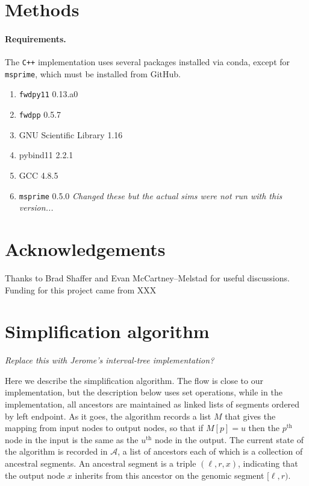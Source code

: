 \documentclass{article}
\newcommand{\fwdpp}{\texttt{fwdpp}}
\newcommand{\fwdpy}{\texttt{fwdpy11}}
\newcommand{\cpp}{\texttt{C++}}
\newcommand{\msprime}{\texttt{msprime}}
\newcommand{\Al}{\mathcal{A}}  %
\newcommand{\plr}[1]{{\em \color{blue} #1}}
\newcommand{\jda}[1]{{\em \color{cyan} #1}}
\begin{document}
\section*{Methods}

\paragraph{Requirements.}
The \cpp{} implementation uses several packages installed via conda,
except for \msprime{}, which must be installed from GitHub.

\begin{enumerate}
    \item \fwdpy{} 0.13.a0
    \item \fwdpp{} 0.5.7
    \item GNU Scientific Library 1.16
    \item pybind11 2.2.1
    \item GCC 4.8.5
    \item \msprime{} 0.5.0 \jda{Changed these but the actual sims were not run
		    with this version...}
\end{enumerate}

\section*{Acknowledgements}
Thanks to Brad Shaffer and Evan McCartney--Melstad for useful discussions.
Funding for this project came from XXX




\appendix

\section{Simplification algorithm}
\label{ss:simplify_algorithm}

\plr{Replace this with Jerome's interval-tree implementation?}

Here we describe the simplification algorithm.
The flow is close to our implementation,
but the description below uses set operations,
while in the implementation,
all ancestors are maintained as linked lists of segments
ordered by left endpoint.
As it goes, the algorithm
records a list $M$ that gives the mapping
from input nodes to output nodes,
so that if $M[p] = u$ then the $p^\text{th}$ node in the input
is the same as the $u^\text{th}$ node in the output.
The current state of the algorithm is recorded in $\Al$,
a list of ancestors
each of which is a collection of ancestral segments.
An ancestral segment is a triple $(\ell, r, x)$,
indicating that the output node $x$ inherits from this ancestor
on the genomic segment $[\ell, r)$.
\end{document}
